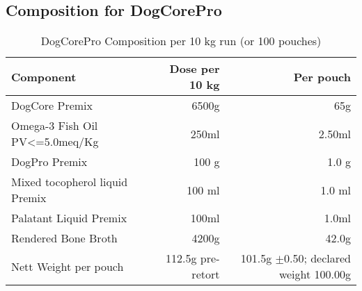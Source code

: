 \vspace{1em}
\subsection*{Composition for DogCorePro}
\begin{table}[h]
\centering
\caption{DogCorePro Composition per 10 kg run (or 100 pouches)}
\label{tab:dogcore_composition}
\begin{tabular}{@{}l r r@{}}
\toprule
\textbf{Component} & \textbf{Dose per 10 kg} & \textbf{Per pouch} \\
\midrule
DogCore Premix & 6500g & 65g \\ [3pt]
Omega-3 Fish Oil PV<=5.0meq/Kg & 250ml & 2.50ml \\[3pt]
DogPro Premix & 100 g & 1.0 g \\[3pt]
Mixed tocopherol liquid Premix & 100 ml & 1.0 ml \\[3pt]
Palatant Liquid Premix & 100ml & 1.0ml \\[3pt]
\midrule
Rendered Bone Broth & 4200g & 42.0g \\[3pt]
\midrule
Nett Weight per pouch & 112.5g pre-retort & 101.5g $\pm$0.50; declared weight 100.00g\\[3pt]
\bottomrule
\bottomrule
\end{tabular}
\end{table}
\vspace{1em}

